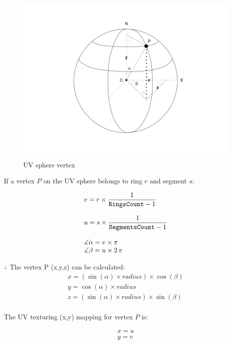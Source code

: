 \begin{figure}[H]
\caption{UV sphere vertex}
\label{fig:uv-sphere-vertex}
\centering
\includegraphics[width=\textwidth, keepaspectratio]{Figures/uv-sphere-vertex.png}
\decoRule
\end{figure}

If a vertex $P$ on the UV sphere belongs to ring $r$ and segment $s$:

\[
\begin{array}{lr}
v = r \times  \dfrac{1}{\texttt{RingsCount} - 1}\\\\
u = s \times  \dfrac{1}{\texttt{SegmentsCount} - 1}\\\\
\measuredangle \alpha = v \times \pi\\
\measuredangle \beta = u \times 2\,\pi\\
\end{array}
\]

$\therefore$ The vertex P (x,\;y,\;z) can be calculated:
\[
\begin{array}{lr}
x = (\sin(\alpha) \times radius) \times \cos(\beta)\\
y = \cos(\alpha) \times radius\\
z =  (\sin(\alpha) \times radius) \times \sin(\beta)\\
\end{array}
\]

The UV texturing (x,\;y) mapping for vertex $P$ is:

\[
\begin{array}{lr}
x = u\\
y = v\\
\end{array}
\]

